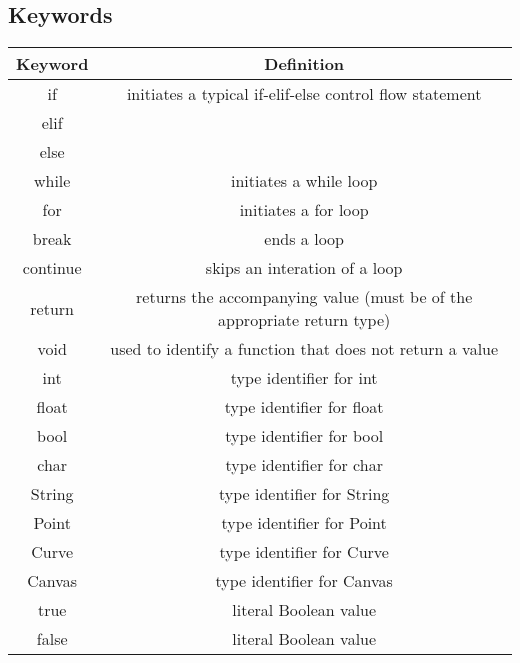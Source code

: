 \documentclass{article}
\begin{document}
\subsection{Keywords}
\begin{center}
\begin{tabular}{ |c c| }
    \hline 
    \bf Keyword & \bf Definition \\
    \hline
    if & initiates a typical if-elif-else control flow statement \\
    elif & \\   
    else & \\
    while & initiates a while loop \\
    for & initiates a for loop \\
    break & ends a loop\\
    continue & skips an interation of a loop\\
    return & returns the accompanying value (must be of the appropriate return type) \\
    void & used to identify a function that does not return a value \\
    int & type identifier for int \\
    float & type identifier for float \\
    bool & type identifier for bool \\
    char & type identifier for char \\
    String & type identifier for String \\
    Point & type identifier for Point \\
    Curve & type identifier for Curve \\
    Canvas & type identifier for Canvas \\
    true & literal Boolean value\\
    false & literal Boolean value\\
    \hline
\end{tabular}
\end{center}
\end{document}
